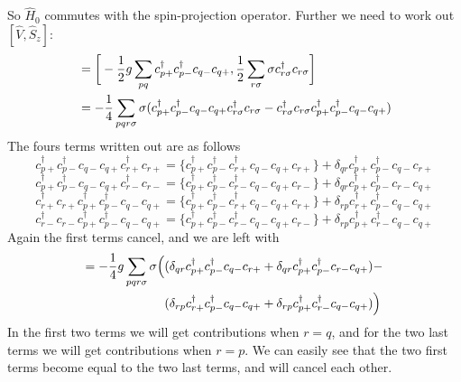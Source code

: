 \documentclass[norsk,a4paper,12pt]{article}
\begin{document}
So $\hat{H}_0$ commutes with the spin-projection operator. Further we need to work out  $[\hat{V},\hat{S}_z]$:
\begin{align*}
[\hat{V},\hat{S}_z]&=\bigg[-\frac{1}{2}g\sum_{pq}c_{p+}^{\dagger}c_{p-}^{\dagger}c_{q-}c_{q+},\frac{1}{2}\sum_{r\sigma}\sigma c_{r\sigma}^{\dagger}c_{r\sigma}\bigg]\notag\\
&=-\frac{1}{4}\sum_{pqr\sigma}\sigma(c_{p+}^{\dagger}c_{p-}^{\dagger}c_{q-}c_{q+}c_{r\sigma}^{\dagger}c_{r\sigma}-c_{r\sigma}^{\dagger}c_{r\sigma}c_{p+}^{\dagger}c_{p-}^{\dagger}c_{q-}c_{q+})
\end{align*}
The fours terms written out are as follows
\begin{equation*}
c_{p+}^{\dagger}c_{p-}^{\dagger}c_{q-}c_{q+}c_{r+}^{\dagger}c_{r+}=\{c_{p+}^{\dagger}c_{p-}^{\dagger}c_{r+}^{\dagger}c_{q-}c_{q+}c_{r+}\}+\delta_{qr}c_{p+}^{\dagger}c_{p-}^{\dagger}c_{q-}c_{r+}
\end{equation*}
\begin{equation*}
c_{p+}^{\dagger}c_{p-}^{\dagger}c_{q-}c_{q+}c_{r-}^{\dagger}c_{r-}=\{c_{p+}^{\dagger}c_{p-}^{\dagger}c_{r-}^{\dagger}c_{q-}c_{q+}c_{r-}\}+\delta_{qr}c_{p+}^{\dagger}c_{p-}^{\dagger}c_{r-}c_{q+}
\end{equation*}
\begin{equation*}
c_{r+}^{\dagger}c_{r+}c_{p+}^{\dagger}c_{p-}^{\dagger}c_{q-}c_{q+}=\{c_{p+}^{\dagger}c_{p-}^{\dagger}c_{r+}^{\dagger}c_{q-}c_{q+}c_{r+}\}+\delta_{rp}c_{r+}^{\dagger}c_{p-}^{\dagger}c_{q-}c_{q+}
\end{equation*}
\begin{equation*}
c_{r-}^{\dagger}c_{r-}c_{p+}^{\dagger}c_{p-}^{\dagger}c_{q-}c_{q+}=\{c_{p+}^{\dagger}c_{p-}^{\dagger}c_{r-}^{\dagger}c_{q-}c_{q+}c_{r-}\}+\delta_{rp}c_{p+}^{\dagger}c_{r-}^{\dagger}c_{q-}c_{q+}
\end{equation*}
Again the first terms cancel, and we are left with
\begin{align*}
[\hat{V},\hat{S}_z]=-\frac{1}{4}g\sum_{pqr\sigma}\sigma\Big(&(\delta_{qr}c_{p+}^{\dagger}c_{p-}^{\dagger}c_{q-}c_{r+}+\delta_{qr}c_{p+}^{\dagger}c_{p-}^{\dagger}c_{r-}c_{q+})-\notag\\
&(\delta_{rp}c_{r+}^{\dagger}c_{p-}^{\dagger}c_{q-}c_{q+}+\delta_{rp}c_{p+}^{\dagger}c_{r-}^{\dagger}c_{q-}c_{q+})\Big)
\end{align*}
In the first two terms we will get contributions when $r=q$, and for the two last terms we will get contributions when $r=p$. We can easily see that the two first terms become equal to the two last terms, and will cancel each other.
\end{document}
